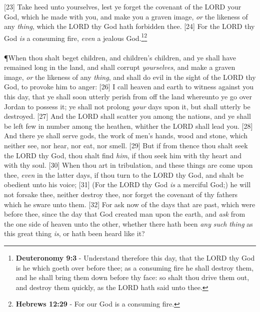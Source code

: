 [23] \textcolor[cmyk]{0.99998,1,0,0}{Take heed unto yourselves, lest ye forget the   {covenant} of the LORD your God, which he made with you, and make you a graven image, \emph{or} the likeness of any \emph{thing}, which the LORD thy God hath forbidden thee.}
[24] \textcolor[cmyk]{0.99998,1,0,0}{For the LORD thy God \emph{is} a consuming fire, \emph{even} a jealous God.}\footnote{\textbf{Deuteronomy 9:3} - Understand therefore this day, that the LORD thy God is he which goeth over before thee; as a consuming fire he shall destroy them, and he shall bring them down before thy face: so shalt thou drive them out, and destroy them quickly, as the LORD hath said unto thee.}\footnote{\textbf{Hebrews 12:29} - For our God is a consuming fire.}\\
\\
\P \textcolor[cmyk]{0.99998,1,0,0}{When thou shalt beget children, and children's children, and ye shall have remained long in the land, and shall   {corrupt} \emph{yourselves}, and make a graven image, \emph{or} the likeness of any \emph{thing}, and shall do evil in the sight of the LORD thy God, to provoke him to anger:}
[26] \textcolor[cmyk]{0.99998,1,0,0}{I call heaven and earth to witness against you this day, that ye shall soon utterly perish from off the land whereunto ye go over Jordan to possess it; ye shall not prolong \emph{your} days upon it, but shall utterly be destroyed.}
[27] \textcolor[cmyk]{0.99998,1,0,0}{And the LORD shall scatter you among the nations, and ye shall be left few in number among the heathen, whither the LORD shall lead you.}
[28] \textcolor[cmyk]{0.99998,1,0,0}{And there ye shall serve gods, the work of men's hands, wood and stone, which neither see, nor hear, nor eat, nor smell.}
[29] \textcolor[cmyk]{0.99998,1,0,0}{But if from thence thou shalt seek the LORD thy God, thou shalt find \emph{him}, if thou seek him with  thy heart and with  thy soul.}
[30] \textcolor[cmyk]{0.99998,1,0,0}{When thou art in tribulation, and  these things are come upon thee, \emph{even} in the latter days, if thou turn to the LORD thy God, and shalt be obedient unto his voice;}
[31] \textcolor[cmyk]{0.99998,1,0,0}{(For the LORD thy God \emph{is} a merciful God;) he will not forsake thee, neither destroy thee, nor forget the   {covenant} of thy fathers which he sware unto them.}
[32] \textcolor[cmyk]{0.99998,1,0,0}{For ask now of the days that are past, which were before thee, since the day that God created man upon the earth, and \emph{ask} from the one side of heaven unto the other, whether there hath been \emph{any} \emph{such} \emph{thing} as this great thing \emph{is}, or hath been heard like it?}
